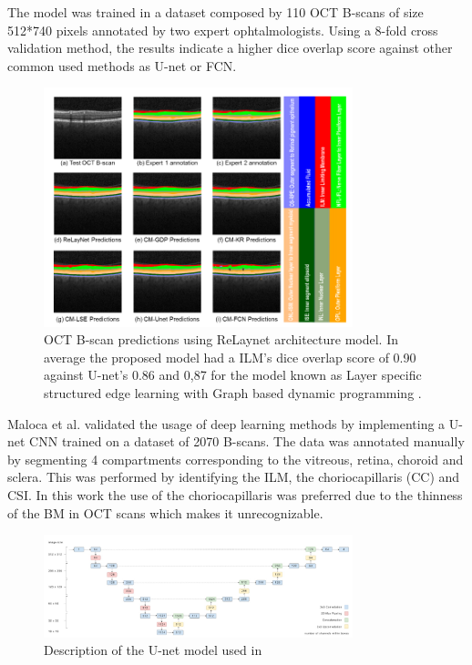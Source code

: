 \documentclass[12pt,a4paper]{scrartcl}
\begin{document}
The model was trained in a dataset composed by 110 OCT B-scans of size 512*740 pixels annotated by two expert ophtalmologists. Using a 8-fold cross validation method, the results indicate a higher dice overlap score against other common used methods as U-net or FCN.

\begin{figure}[H]
    \centering
    \includegraphics[width=0.8\textwidth]{./images/relaynet-predictions.png}
    \caption{OCT B-scan predictions using ReLaynet architecture model. In average the proposed model had a ILM's dice overlap score of 0.90 against U-net's 0.86 and 0,87 for the model known as Layer specific structured edge learning with  Graph based dynamic programming  \cite{Roy2017}.}
\end{figure}

Maloca et al. \cite{Maloca2019} validated the usage of deep learning methods by implementing a U-net CNN trained on a dataset of 2070 B-scans. The data was annotated manually by segmenting 4 compartments corresponding to the vitreous, retina, choroid and sclera. This was performed by identifying the ILM, the choriocapillaris (CC) and CSI. In this work the use of the choriocapillaris was preferred due to the thinness of the BM in OCT scans which makes it unrecognizable.

\begin{figure}[H]
    \centering
    \includegraphics[width=0.8\textwidth]{./images/maloca-unet.png}
    \caption{Description of the U-net model used in \cite{Maloca2019}}
\end{figure}
\end{document}
